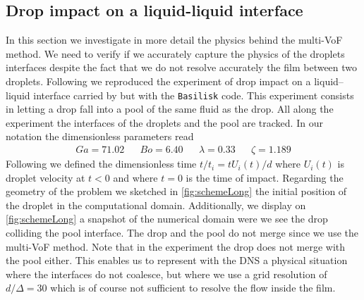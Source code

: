 \subsection*{Drop impact on a liquid-liquid interface}

In this section we investigate in more detail the physics behind the multi-VoF method. 
We need to verify if we accurately capture the physics of the droplets interfaces despite the fact that we do not resolve accurately the film between two droplets. 
Following \citet{balcazar2015multiple} we reproduced the experiment of drop impact on a liquid–liquid interface carried by \citet{mohamed2003drop} but with the \texttt{Basilisk} code. 
This experiment consists in letting a drop fall into a pool of the same fluid as the drop. 
All along the experiment the interfaces of the droplets and the pool are tracked. 
In our notation the dimensionless parameters read 
\begin{align*}
    Ga = 71.02 
    && Bo = 6.40
    && \lambda = 0.33
    && \zeta = 1.189
\end{align*}
Following \citet{mohamed2003drop} we defined the dimensionless time $t / t_i = t U_i(t) /d$ where $U_i(t)$ is droplet velocity at $t<0$ and where $t=0$ is the time of impact. 
Regarding the geometry of the problem we sketched in \ref{fig:schemeLong} the initial position of the droplet in the computational domain.
Additionally, we display on \ref{fig:schemeLong} a snapshot of the numerical domain were we see the drop colliding the pool interface.
The drop and the pool do not merge since we use the multi-VoF method. 
Note that in the experiment the drop does not merge with the pool either.
This enables us to represent with the DNS a physical situation where the interfaces do not coalesce, but where we use a grid resolution of $d/\Delta = 30$ which is of course not sufficient to resolve the flow inside the film. 
